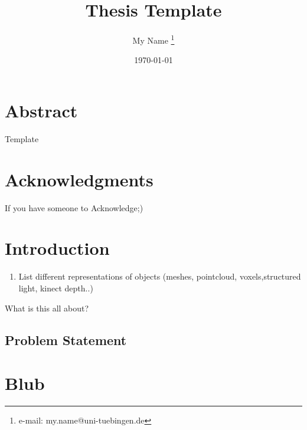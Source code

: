 \documentclass[a4paper,cleardoubleempty,BCOR1cm]{scrbook}
\title{Thesis Template}
\author{My Name \thanks{e-mail: my.name@uni-tuebingen.de}}
\date{\today}
\begin{document}


\chapter*{Abstract}
Template

\chapter*{Acknowledgments}
If you have someone to Acknowledge;)


\tableofcontents


\chapter{Introduction}
\begin{enumerate}
    \item List different representations of objects (meshes, pointcloud, voxels,structured light, kinect depth..)
  \end{enumerate}
What is this all about?

\section{Problem Statement}















\appendix
\chapter{Blub}

%

\end{document}
